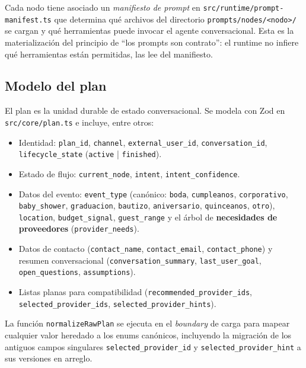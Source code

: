 \documentclass[11pt,a4paper]{article}
\begin{document}
Cada nodo tiene asociado un \emph{manifiesto de prompt} en
\texttt{src/runtime/prompt-manifest.ts} que determina qué archivos del
directorio \texttt{prompts/nodes/<nodo>/} se cargan y qué herramientas
puede invocar el agente conversacional. Esta es la materialización del
principio de ``los prompts son contrato'': el runtime no infiere qué
herramientas están permitidas, las lee del manifiesto.

\subsection{Modelo del plan}

El plan es la unidad durable de estado conversacional. Se modela con Zod
en \texttt{src/core/plan.ts} e incluye, entre otros:

\begin{itemize}[leftmargin=*,itemsep=1pt]
  \item Identidad: \texttt{plan\_id}, \texttt{channel},
        \texttt{external\_user\_id}, \texttt{conversation\_id},
        \texttt{lifecycle\_state} (\texttt{active} | \texttt{finished}).
  \item Estado de flujo: \texttt{current\_node}, \texttt{intent},
        \texttt{intent\_confidence}.
  \item Datos del evento: \texttt{event\_type} (canónico:
        \texttt{boda}, \texttt{cumpleanos}, \texttt{corporativo},
        \texttt{baby\_shower}, \texttt{graduacion}, \texttt{bautizo},
        \texttt{aniversario}, \texttt{quinceanos}, \texttt{otro}),
        \texttt{location}, \texttt{budget\_signal}, \texttt{guest\_range}
        y el árbol de \textbf{necesidades de proveedores}
        (\texttt{provider\_needs}).
  \item Datos de contacto (\texttt{contact\_name}, \texttt{contact\_email},
        \texttt{contact\_phone}) y resumen conversacional
        (\texttt{conversation\_summary}, \texttt{last\_user\_goal},
        \texttt{open\_questions}, \texttt{assumptions}).
  \item Listas planas para compatibilidad (\texttt{recommended\_provider\_ids},
        \texttt{selected\_provider\_ids}, \texttt{selected\_provider\_hints}).
\end{itemize}

La función \texttt{normalizeRawPlan} se ejecuta en el \emph{boundary} de
carga para mapear cualquier valor heredado a los enums canónicos,
incluyendo la migración de los antiguos campos singulares
\texttt{selected\_provider\_id} y \texttt{selected\_provider\_hint} a sus
versiones en arreglo.
\end{document}
